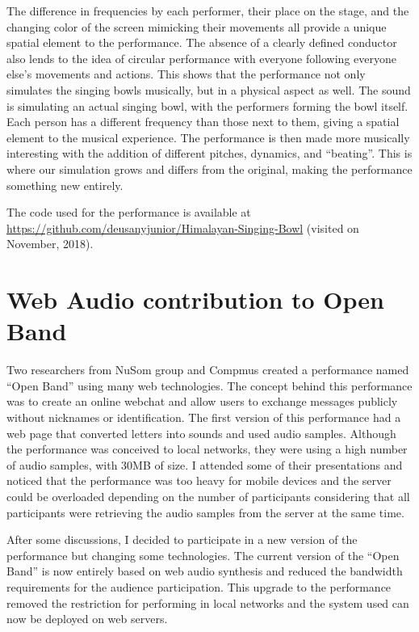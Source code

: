 The difference in frequencies by each performer, their place on the stage, and the changing color of the screen mimicking their movements all provide a unique spatial element to the performance. 
The absence of a clearly defined conductor also lends to the idea of circular performance with everyone following everyone else’s movements and actions. 
This shows that the performance not only simulates the singing bowls musically, but in a physical aspect as well.
The sound is simulating an actual singing bowl, with the performers forming the bowl itself. 
Each person has a different frequency than those next to them, giving a spatial element to the musical experience. 
The performance is then made more musically interesting with the addition of different pitches, dynamics, and ``beating''. 
This is where our simulation grows and differs from the original, making the performance something new entirely.

The code used for the performance is available at\\ \url{https://github.com/deusanyjunior/Himalayan-Singing-Bowl} (visited on November, 2018).

\section{Web Audio contribution to Open Band}
\label{apesec:appbandaaberta}

Two researchers from NuSom group and Compmus created a performance named ``Open Band'' using many web technologies.
The concept behind this performance was to create an online webchat and allow users to exchange messages publicly without nicknames or identification.
The first version of this performance had a web page that converted letters into sounds and used audio samples.
Although the performance was conceived to local networks, they were using a high number of audio samples, with 30MB of size.
I attended some of their presentations and noticed that the performance was too heavy for mobile devices and the server could be overloaded depending on the number of participants considering that all participants were retrieving the audio samples from the server at the same time.

After some discussions, I decided to participate in a new version of the performance but changing some technologies.
The current version of the ``Open Band'' is now entirely based on web audio synthesis and reduced the bandwidth requirements for the audience participation.
This upgrade to the performance removed the restriction for performing in local networks and the system used can now be deployed on web servers.

